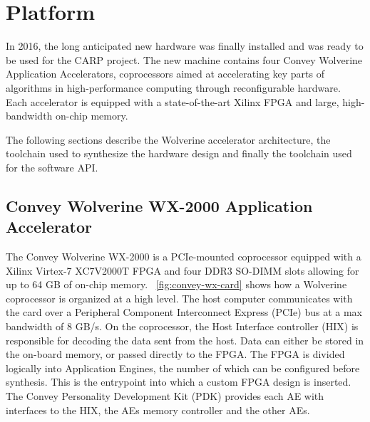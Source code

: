 
\chapter{Platform}
\label{chp:platform}

In 2016, the long anticipated new hardware was finally installed and was ready
to be used for the CARP project. The new machine contains four Convey Wolverine
Application Accelerators, coprocessors aimed at accelerating key parts of
algorithms in high-performance computing through reconfigurable hardware. Each
accelerator is equipped with a state-of-the-art Xilinx FPGA and large,
high-bandwidth on-chip memory.

The following sections describe the Wolverine accelerator architecture, the
toolchain used to synthesize the hardware design and finally the toolchain used
for the software API.

\section{Convey Wolverine WX-2000 Application Accelerator}
\label{sec:coproc}

The Convey Wolverine WX-2000 is a PCIe-mounted coprocessor equipped with a
Xilinx Virtex-7 XC7V2000T FPGA and four DDR3 SO-DIMM slots allowing for up to 64
GB of on-chip memory. \figurename~\ref{fig:convey-wx-card} shows how a Wolverine
coprocessor is organized at a high level. The host computer communicates with
the card over a Peripheral Component Interconnect Express (PCIe) bus at a max
bandwidth of 8 GB/s. On the coprocessor, the Host Interface controller (HIX) is
responsible for decoding the data sent from the host. Data can either be stored
in the on-board memory, or passed directly to the FPGA. The FPGA is divided
logically into Application Engines, the number of which can be configured before
synthesis. This is the entrypoint into which a custom FPGA design is inserted.
The Convey Personality Development Kit (PDK) provides each AE with interfaces to
the HIX, the AEs memory controller and the other AEs.

